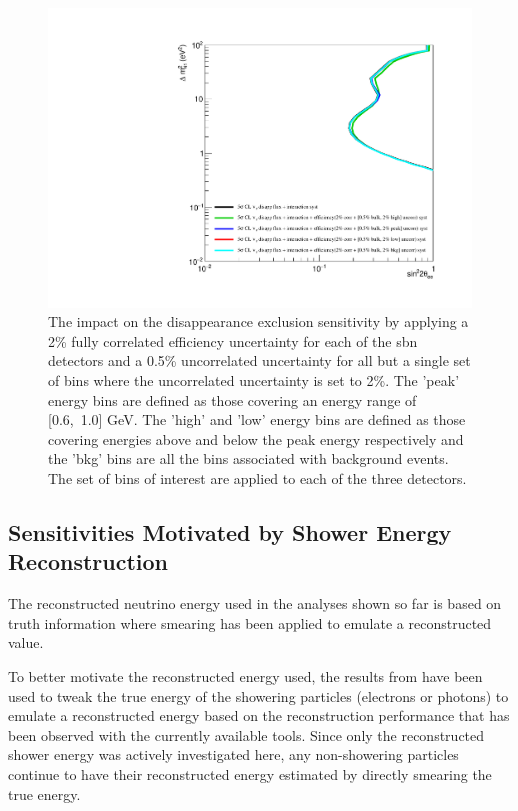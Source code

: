 \begin{figure}[h!]
    \centering
    \includegraphics[width = \largefigwidth]{figures-chap6/exclusion_contours/efficiency_systematics/nue_disapp_2pct_cor_05pct_bulk_2pct_X_uncor.pdf}
    \caption[\nue disapp with poorly constrained efficiency systematic for a set of bins.]{The impact on the \nue disappearance exclusion sensitivity by applying a 2\% fully correlated efficiency uncertainty for each of the \gls{sbn} detectors and a 0.5\% uncorrelated uncertainty for all but a single set of bins where the uncorrelated uncertainty is set to 2\%. The 'peak' energy bins are defined as those covering an energy range of [0.6,~1.0] GeV. The 'high' and 'low' energy bins are defined as those covering energies above and below the peak energy respectively and the 'bkg' bins are all the bins associated with background events. The set of bins of interest are applied to each of the three detectors.}
    \label{fig:nue_disapp_bulk_uncertainty}
\end{figure}

\newpage
\subsection{Sensitivities Motivated by Shower Energy Reconstruction}

The reconstructed neutrino energy used in the analyses shown so far is based on truth information where smearing has been applied to emulate a reconstructed value. 

To better motivate the reconstructed energy used, the results from  have been used to tweak the true energy of the showering particles (electrons or photons) to emulate a reconstructed energy based on the reconstruction performance that has been observed with the currently available tools. Since only the reconstructed shower energy was actively investigated here, any non-showering particles continue to have their reconstructed energy estimated by directly smearing the true energy. 

